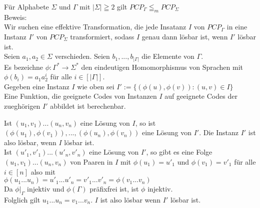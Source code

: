 \begin{lemma}{}
    Für Alphabete $\Sigma$ und $\Gamma$ mit $|\Sigma| \geqq 2$ gilt $PCP_{\Gamma} \leqq_m PCP_{\Sigma}$ \\

    Beweis: \\
    Wir suchen eine effektive Transformation, die jede Insatanz $I$ von $PCP_\Gamma$ in eine Instanz $I'$ von
    $PCP_\Sigma$ transformiert, sodass $I$ genau dann lösbar ist, wenn $I'$ lösbar ist. \\

    Seien $a_1,a_2 \in \Sigma$ verschieden. Seien $b_1,...,b_{|\Gamma|}$ die Elemente von $\Gamma$. \\
    Es bezeichne $\phi : \Gamma^* \rightarrow \Sigma^*$ den eindeutigen Homomorphismus von Sprachen mit
    $\phi(b_i) = a_1a_2^i$ für alle $i \in [|\Gamma|]$. \\

    Gegeben eine Instanz $I$ wie oben sei $I':=\{(\phi(u),\phi(v)):(u,v) \in I\}$ \\
    Eine Funktion, die geeignete Codes von Instanzen $I$ auf geeignete Codes der zueghörigen $I'$ abbildet
    ist berechenbar.
    
    Ist $(u_1,v_1)...(u_n,v_n)$ eine Lösung von $I$, so ist $(\phi(u_1),\phi(v_1)),...,(\phi(u_n),\phi(v_n))$
    eine Lösung von $I'$. Die Instanz $I'$ ist also lösbar, wenn $I$ lösbar ist. \\

    Ist $(u'_1,v'_1)...(u'_n,v'_n)$ eine Lösung von $I'$, so gibt es eine Folge $(u_1,v_1)...(u_n,v_n)$ von Paaren in
    $I$ mit $\phi(u_1)=u'_1$ und $\phi(v_1)=v'_1$ für alle $i \in [n]$ also mit \\
    $\phi(u_1...u_n) = u'_1...u'_n = v'_1 ...v'_n = \phi(v_1...v_n)$ \\

    Da $\phi|_\Gamma$ injektiv und $\phi(\Gamma)$ präfixfrei ist, ist $\phi$ injektiv. \\
    Folglich gilt $u_1...u_n = v_1...v_n$. $I$ ist also lösbar wenn $I'$ lösbar ist.
\end{lemma}